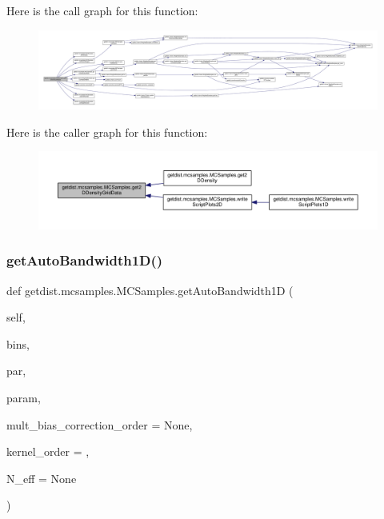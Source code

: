 Here is the call graph for this function\+:
\nopagebreak
\begin{figure}[H]
\begin{center}
\leavevmode
\includegraphics[width=350pt]{classgetdist_1_1mcsamples_1_1MCSamples_a591064d13448b148006ce8246ad4446f_cgraph}
\end{center}
\end{figure}
Here is the caller graph for this function\+:
\nopagebreak
\begin{figure}[H]
\begin{center}
\leavevmode
\includegraphics[width=350pt]{classgetdist_1_1mcsamples_1_1MCSamples_a591064d13448b148006ce8246ad4446f_icgraph}
\end{center}
\end{figure}
\mbox{\label{classgetdist_1_1mcsamples_1_1MCSamples_a0e632352cb52bb4c05cb060427fcb0bc}} 
\subsubsection{\texorpdfstring{get\+Auto\+Bandwidth1\+D()}{getAutoBandwidth1D()}}
{\footnotesize\ttfamily def getdist.\+mcsamples.\+M\+C\+Samples.\+get\+Auto\+Bandwidth1D (\begin{DoxyParamCaption}\item[{}]{self,  }\item[{}]{bins,  }\item[{}]{par,  }\item[{}]{param,  }\item[{}]{mult\+\_\+bias\+\_\+correction\+\_\+order = {\ttfamily None},  }\item[{}]{kernel\+\_\+order = {},  }\item[{}]{N\+\_\+eff = {\ttfamily None} }\end{DoxyParamCaption})}

